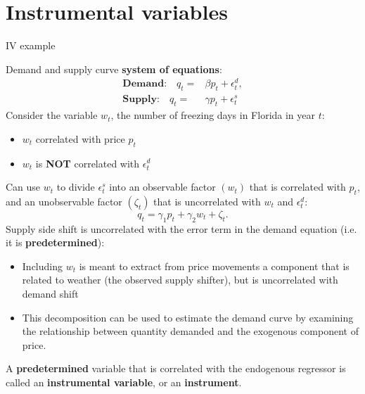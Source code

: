 \documentclass[compress, 8pt]{beamer}
\begin{document}
\section[IV]{Instrumental variables}
\miniframesoff
\begin{frame}
    \tableofcontents[currentsection]
\end{frame}
\miniframeson

\begin{frame}{IV example}

Demand and supply curve \textbf{system of equations}: 
\begin{align*}
    \textbf{Demand:} \quad q_t =& \beta p_t + \epsilon_t^d, \\
    \textbf{Supply:} \quad q_t =& \gamma p_t + \epsilon_t^s
\end{align*}
Consider the variable $w_{t}$, the number of freezing days in Florida
in year $t$:
\begin{itemize}
     \item $w_t$ correlated with price $p_t$
     \item $w_t$ is \textbf{NOT} correlated with $\epsilon_t^d$ 
 \end{itemize} 
Can use $w_t$ to divide $\epsilon_{t}^{s}$ into an observable factor $(w_{t})$ that is correlated with $p_{t}$, and an unobservable factor $(\zeta_{t})$ that is uncorrelated with $w_{t}$ and $\epsilon_{t}^{d}$:
\[
q_{t}=\gamma_{1}p_{t}+\gamma_{2}w_{t}+\zeta_{t}.
\]
Supply side shift is uncorrelated with the error term in the demand equation (i.e. it is \textbf{predetermined}):
\begin{itemize}
    \item Including $w_{t}$ is meant to extract from price movements a component
that is related to weather (the observed supply shifter), but is uncorrelated
with demand shift
\item This decomposition can be used to estimate the
demand curve by examining the relationship between quantity demanded
and the exogenous component of price. 
\end{itemize}
A \textbf{predetermined} variable that is correlated with the endogenous regressor is called an
\textbf{instrumental variable}, or an \textbf{instrument}. 

\end{frame}
\end{document}
